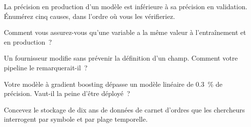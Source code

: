 \begin{interviewq}\label{iq:in:machine-learning-and-data-engineer:2}
La précision en production d'un modèle est inférieure à sa précision en validation. Énumérez cinq causes, dans l'ordre où vous les vérifieriez.
\end{interviewq}

\begin{interviewq}\label{iq:in:machine-learning-and-data-engineer:3}
Comment vous assurez-vous qu'une variable a la même valeur à l'entraînement et en production~?
\end{interviewq}

\begin{interviewq}\label{iq:in:machine-learning-and-data-engineer:4}
Un fournisseur modifie sans prévenir la définition d'un champ. Comment votre pipeline le remarquerait-il~?
\end{interviewq}

\begin{interviewq}\label{iq:in:machine-learning-and-data-engineer:5}
Votre modèle à gradient boosting dépasse un modèle linéaire de 0.3~\% de précision. Vaut-il la peine d'être déployé~?
\end{interviewq}

\begin{interviewq}\label{iq:in:machine-learning-and-data-engineer:6}
Concevez le stockage de dix ans de données de carnet d'ordres que les chercheurs interrogent par symbole et par plage temporelle.
\end{interviewq}
